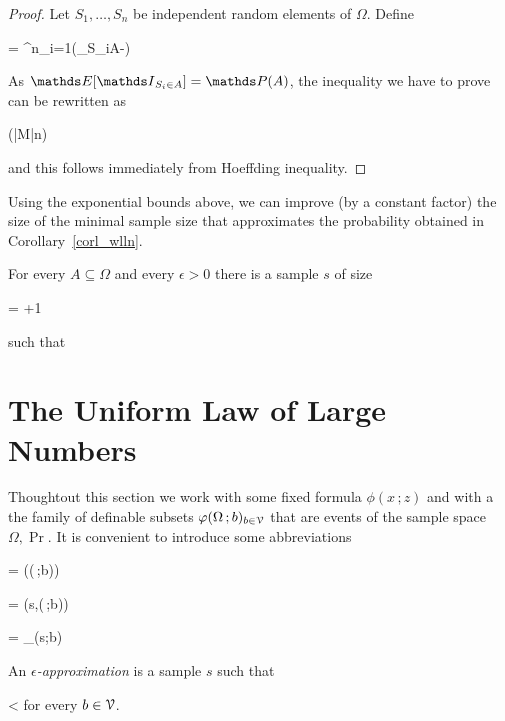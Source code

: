 \documentclass[scombinatorics.tex]{subfiles}
\begin{document}
\begin{proof}
  Let $S_1,\dots,S_n$ be independent random elements of $\Omega$.
  Define
  
  {=}
  {\sum^n_{i=1}\Big(\Indicator_{S_i\in A}-\Ex[\Indicator_{S_i\in A}]\Big)}

  As $\Ex[\Indicator_{S_i\in A}]=\Pr(A)$, the inequality we have to prove can be rewritten as 

  {\ge}
  {\Pr \Big(|M|\ge n\epsilon\Big)}

  and this follows immediately from Hoeffding inequality.
  \end{proof}


Using the exponential bounds above, we can improve (by a constant factor) the size of the minimal sample size that approximates the probability obtained in Corollary~\ref{corl_wlln}.

\begin{corollary}
  For every $A\subseteq\Omega$ and every $\epsilon>0$ there is a sample $s$ of size

      {=}
      {\left\lfloor{}+1\right\rfloor} 
      
  such that

  \QED
\end{corollary}


\section{The Uniform Law of Large Numbers}\label{uniform}

Thoughtout this section we work with some fixed formula $\phi(x\,;z)$ and with a the family of definable subsets $\varphi(\Omega\,;b)_{b\in\EuScript V}$ that are events of the sample space $\Omega,\Pr$.
It is convenient to introduce some abbreviations

{=}
{\Pr\Big(\phi(\Omega\,;b)\Big)}

{=}
{\Fr\Big(s,\phi(\Omega\,;b)\Big)}

{=}
{\Indicator_{\phi(s;b)}}

An \emph{$\epsilon$-approximation\/} is a sample $s$ such that

{<}
{\epsilon}
\hfill for every $b\in\EuScript V$.
\end{document}

